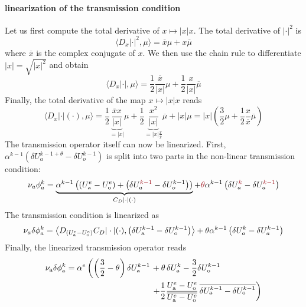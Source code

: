 \paragraph{linearization of the transmission condition}
Let us first compute the total derivative of $x\mapsto |x|x$.
The total derivative of $|\cdot|^2$ is
\begin{equation}
\langle D_x |\cdot|^2, \mu \rangle
= \overline{x} \mu + x \overline{\mu}
\end{equation}
where $\overline{x}$ is the complex conjugate of $x$.
We then use the chain rule to differentiate $|x| = \sqrt{|x|^2}$ and
obtain
\begin{equation}
\langle D_x |\cdot|, \mu \rangle =
\frac{1}{2} \frac{\overline{x}}{|x|} \mu
+ \frac{1}{2} \frac{x}{|x|} \overline{\mu}
\end{equation}
Finally, the total derivative of the map $x\mapsto |x|x$ reads
\begin{equation}
	\langle D_x |\cdot|(\cdot), \mu \rangle =
	\frac{1}{2} \underbrace{\frac{\overline{x}x}{|x|}}_{=|x|} \mu
	+ \frac{1}{2}
	\underbrace{\frac{x^2}{|x|}}_{=|x|\frac{x}{\overline{x}}}
	\overline{\mu}
	+ |x|\mu
	= |x| \left(\frac{3}{2}\mu + \frac{1}{2}\frac{x}{\overline{x}}
	\overline{\mu}\right)
\end{equation}
The transmission operator itself can now be linearized.
First, $\alpha^{k-1} \left(\delta U_a^{k-1+\theta}
- \delta U_o^{k-1}\right)$
is split into two parts in the non-linear transmission condition:
\begin{equation}
	\nu_a \phi_a^k =
	\underbrace{
	\alpha^{k-1} \left(\left(U^e_{\rm a} - U^e_{\rm o}\right) +
	\left(\delta U_a^{\emphase{k-1}}
	- \delta U_o^{k-1}\right)\right)}_{C_D|\cdot|(\cdot)}
	+ \emphase{\theta} \alpha^{k-1}
	\left(\delta U_a^{\emphase{k}} - \delta U_a^{\emphase{k-1}}
	\right)
\end{equation}
The transmission condition is linearized as
\begin{equation}
	\nu_a \delta \phi_a^k = \left\langle
	D_{\left(U_{\rm a}^e - U_{\rm o}^e\right)}
	C_D |\cdot|(\cdot),
	\left(\delta U_{\rm a}^{k-1} -
	\delta U_{\rm o}^{k-1}
	\right)
	\right\rangle
	+ \theta \alpha^{k-1}
	\left(\delta U_a^{k} - \delta U_a^{k-1}
	\right)
\end{equation}
Finally, the linearized transmission operator reads
\begin{equation}
\label{eq:linearised}
\begin{aligned}
\nu_{\rm a}\delta\phi_{\rm a}^k = \alpha^e 
\left( \left(\frac{3}{2} - \theta \right)\delta U_{\rm a}^{k-1} \right.
&+ \theta\, \delta U_{\rm a}^{k}
- \frac{3}{2} \delta U_{\rm o}^{k-1}
\\
&\left.+ \frac{1}{2}\frac{U_{\rm a}^{{\color{black} e}} - U_{\rm o}^{{\color{black} e}}}
	{\overline{U_{\rm a}^{{\color{black} e}} - U_{\rm o}^{{\color{black} e}}}}\,
\overline{
\delta U_{\rm a}^{k-1} - \delta U_{\rm o}^{k-1}}
\right)
\end{aligned}
\end{equation}
